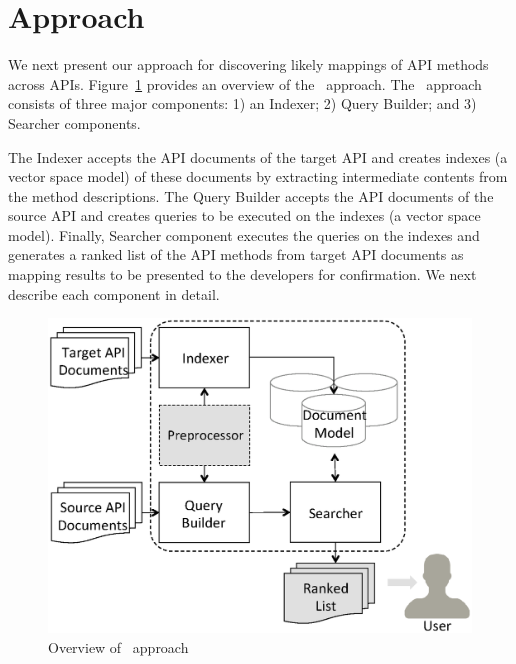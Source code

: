 \section{Approach}
\label{sec:approach}

We next present our approach for discovering 
likely mappings of API methods  across APIs. 
Figure~\ref{fig:approachOverview} provides an overview of the \tool\ approach.
The \tool\ approach consists of three major components: 1) an Indexer; 2) Query Builder; and 3) Searcher components.


The Indexer accepts the API documents of the target API
and creates indexes (a vector space model) of these documents 
by extracting intermediate contents from the method descriptions. 
The Query Builder accepts the API documents of the source API
and creates queries to be executed on the indexes (a vector space model).
Finally, Searcher component executes the queries on the indexes and 
generates a ranked list of the API methods from target API documents as
mapping results to be presented to the developers for confirmation. 
We next describe each component in detail.


\begin{figure}
	\begin{center}
		\includegraphics[scale=0.45,clip=true, trim=120pt 80pt 10pt 80pt]{ApproahOverview.eps}
		\caption{\label{fig:approachOverview} Overview of \tool\ approach}
	\end{center}
\end{figure}


